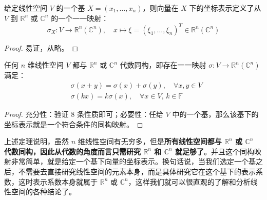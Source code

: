 \begin{theorem}[坐标表示构成的映射]
给定线性空间 $V$ 的一个基 $X=(x_1,\ldots,x_n)$，则向量在 $X$ 下的坐标表示定义了从 $V$ 到 $\mathbb R^n$ 或 $\mathbb C^n$ 的一个一一映射：
\[
    \sigma_X: V\to\mathbb R^n (\mathbb C^n),\quad x\mapsto \xi=(\xi_1,\ldots,\xi_n)^T\in\mathbb R^n (\mathbb C^n)
\]
\end{theorem}
\begin{proof}
易证，从略。
\end{proof}

\begin{theorem}
任何 $n$ 维线性空间 $V$ 都与 $\mathbb R^n$ 或 $\mathbb C^n$ 代数同构，即存在一一映射 $\sigma:V\to\mathbb R^n(\mathbb C^n)$ 满足：
\begin{align*}
    &\sigma(x+y)=\sigma(x)+\sigma(y),\quad\forall x,y\in V\\
    &\sigma(kx)=k\sigma(x),\quad\forall x\in V,\,k\in \mathbb F
\end{align*}
\end{theorem}

\begin{proof}
充分性：验证 8 条性质即可；必要性：任给 $V$ 中的一个基，那么该基下的坐标表示就是一个符合条件的同构映射。
\end{proof}

上述定理说明，虽然 $n$ 维线性空间有无穷多，但是\textbf{所有线性空间都与 $\mathbb R^n$ 或 $\mathbb C^n$ 代数同构，因此从代数的角度而言只需研究 $\mathbb R^n$ 和 $\mathbb C^n$ 就足够了}。并且这个同构映射非常简单，就是给定一个基下向量的坐标表示。换句话说，当我们选定一个基之后，不需要去直接研究线性空间的元素本身，而是具体研究它在这个基下的表示系数，这时表示系数本身就属于 $\mathbb R^n$ 或 $\mathbb C^n$，这样我们就可以很直观的了解和分析线性空间的各种结论了。


